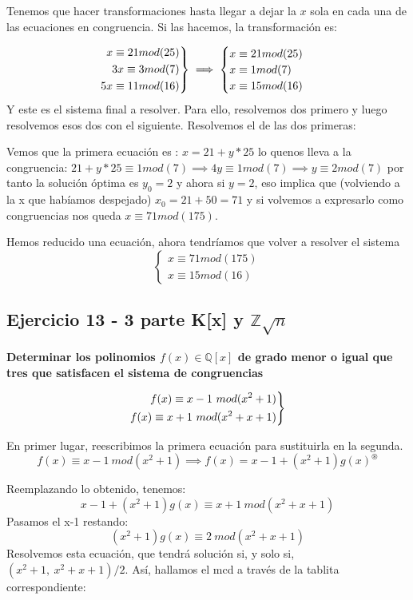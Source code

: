 \documentclass[11pt, a4paper, titlepage]{article}
\providecommand{\ent}{\mathbb{Z}}
\providecommand{\rac}{\mathbb{Q}}
\newenvironment{rcases}
  {\left.\begin{aligned}}
  {\end{aligned}\right\rbrace}
\begin{document}
Tenemos que hacer transformaciones hasta llegar a dejar la $x$ sola en cada una de las ecuaciones en congruencia. Si las hacemos, la transformación es:



\[
\begin{rcases}
	x \equiv 21 mod(25)\\
	3x \equiv 3 mod(7)\\
	5x \equiv 11 mod(16)
\end{rcases} \implies \begin{cases}
	 x \equiv 21 mod(25)\\
	 x \equiv 1 mod(7)\\
	 x \equiv 15 mod(16)
\end{cases}
\]
Y este es el sistema final a resolver. Para ello, resolvemos dos primero y luego resolvemos esos dos con el siguiente. Resolvemos el de las dos primeras:

Vemos que la primera ecuación es : $x = 21+y*25$ lo quenos lleva a la congruencia: $21 +y*25 \equiv 1 mod(7) \implies 4y \equiv 1 mod(7) \implies y \equiv 2 mod(7)$ por tanto la solución óptima es $y_0 = 2$ y ahora si $y=2$, eso implica que (volviendo a la x que habíamos despejado) $x_0 = 21+50 = 71$ y si volvemos a expresarlo como congruencias nos queda $x \equiv 71 mod(175)$. 

Hemos reducido una ecuación, ahora tendríamos que volver a resolver el sistema
\[
\begin{cases}
	x \equiv 71 mod(175)\\
	x \equiv 15 mod(16)
\end{cases}
\]

\subsection{\LARGE{Ejercicio 13 - 3 parte K[x] y $\ent\sqrt{n}$}}

\textbf{Determinar los polinomios $f(x) \in \rac [x]$ de grado menor o igual que tres que satisfacen el sistema de congruencias}

\[
\begin{rcases}
	f(x) \equiv x - 1\ mod(x^2+1)\\
	f(x) \equiv x + 1\ mod(x^2+x+1)
\end{rcases}
\]

En primer lugar, reescribimos la primera ecuación para sustituirla en la segunda. 
$$f(x) \equiv x - 1\ mod(x^2+1) \implies f(x) = x-1 + (x^2+1)g(x)^\circledast$$

Reemplazando lo obtenido, tenemos:
$$x-1 + (x^2+1)g(x) \equiv x+1\ mod(x^2+x+1)$$ 
Pasamos el x-1 restando:
$$(x^2+1)g(x) \equiv 2\ mod(x^2+x+1)$$
Resolvemos esta ecuación, que tendrá solución si, y solo si, $(x^2+1,\ x^2+x+1)/2$. Así, hallamos el mcd a través de la tablita correspondiente:
\end{document}
